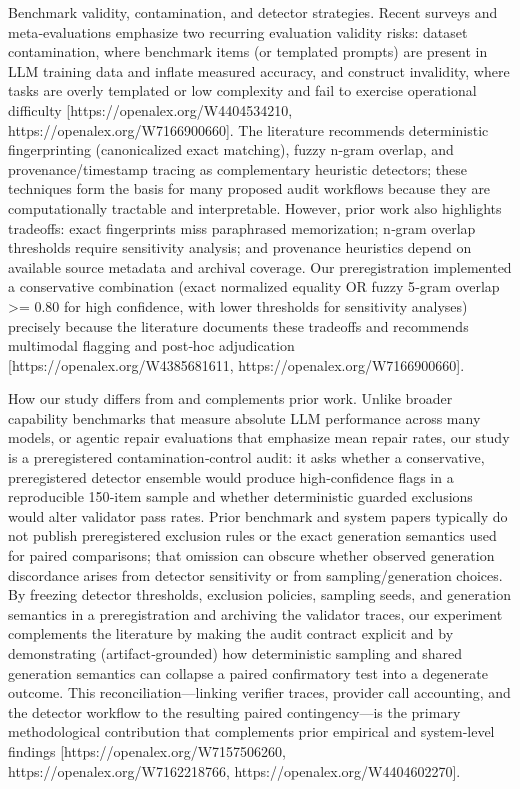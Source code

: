 \documentclass[conference]{IEEEtran}
\begin{document}
Benchmark validity, contamination, and detector strategies. Recent surveys and meta‑evaluations emphasize two recurring evaluation validity risks: dataset contamination, where benchmark items (or templated prompts) are present in LLM training data and inflate measured accuracy, and construct invalidity, where tasks are overly templated or low complexity and fail to exercise operational difficulty [https://openalex.org/W4404534210, https://openalex.org/W7166900660]. The literature recommends deterministic fingerprinting (canonicalized exact matching), fuzzy n‑gram overlap, and provenance/timestamp tracing as complementary heuristic detectors; these techniques form the basis for many proposed audit workflows because they are computationally tractable and interpretable. However, prior work also highlights tradeoffs: exact fingerprints miss paraphrased memorization; n‑gram overlap thresholds require sensitivity analysis; and provenance heuristics depend on available source metadata and archival coverage. Our preregistration implemented a conservative combination (exact normalized equality OR fuzzy 5‑gram overlap >= 0.80 for high confidence, with lower thresholds for sensitivity analyses) precisely because the literature documents these tradeoffs and recommends multimodal flagging and post‑hoc adjudication [https://openalex.org/W4385681611, https://openalex.org/W7166900660].

How our study differs from and complements prior work. Unlike broader capability benchmarks that measure absolute LLM performance across many models, or agentic repair evaluations that emphasize mean repair rates, our study is a preregistered contamination‑control audit: it asks whether a conservative, preregistered detector ensemble would produce high‑confidence flags in a reproducible 150‑item sample and whether deterministic guarded exclusions would alter validator pass rates. Prior benchmark and system papers typically do not publish preregistered exclusion rules or the exact generation semantics used for paired comparisons; that omission can obscure whether observed generation discordance arises from detector sensitivity or from sampling/generation choices. By freezing detector thresholds, exclusion policies, sampling seeds, and generation semantics in a preregistration and archiving the validator traces, our experiment complements the literature by making the audit contract explicit and by demonstrating (artifact‑grounded) how deterministic sampling and shared generation semantics can collapse a paired confirmatory test into a degenerate outcome. This reconciliation---linking verifier traces, provider call accounting, and the detector workflow to the resulting paired contingency---is the primary methodological contribution that complements prior empirical and system‑level findings [https://openalex.org/W7157506260, https://openalex.org/W7162218766, https://openalex.org/W4404602270].
\end{document}
